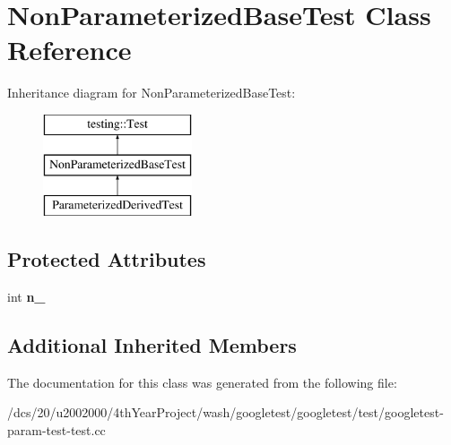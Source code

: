 \hypertarget{classNonParameterizedBaseTest}{}\section{Non\+Parameterized\+Base\+Test Class Reference}
\label{classNonParameterizedBaseTest}
Inheritance diagram for Non\+Parameterized\+Base\+Test\+:\begin{figure}[H]
\begin{center}
\leavevmode
\includegraphics[height=3.000000cm]{classNonParameterizedBaseTest}
\end{center}
\end{figure}
\subsection*{Protected Attributes}
\begin{DoxyCompactItemize}
\item 
\mbox{\label{classNonParameterizedBaseTest_a617d4bbfd2aa5f6d41eea3089f7ad039}} 
int {\bfseries n\+\_\+}
\end{DoxyCompactItemize}
\subsection*{Additional Inherited Members}


The documentation for this class was generated from the following file\+:\begin{DoxyCompactItemize}
\item 
/dcs/20/u2002000/4th\+Year\+Project/wash/googletest/googletest/test/googletest-\/param-\/test-\/test.\+cc\end{DoxyCompactItemize}
